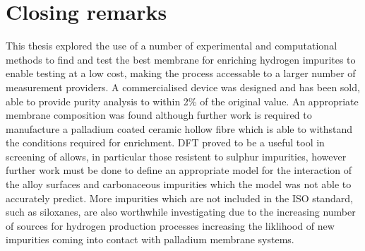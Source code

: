 \section{Closing remarks}
This thesis explored the use of a number of experimental and computational methods to find and test the best membrane for enriching hydrogen impurites to enable testing at a low cost, making the process accessable to a larger number of measurement providers. A commercialised device was designed and has been sold, able to provide purity analysis to within 2\% of the original value. An appropriate membrane composition was found although further work is required to manufacture a palladium coated ceramic hollow fibre which is able to withstand the conditions required for enrichment. DFT proved to be a useful tool in screening of allows, in particular those resistent to sulphur impurities, however further work must be done to define an appropriate model for the interaction of the alloy surfaces and carbonaceous impurities which the model was not able to accurately predict. More impurities which are not included in the ISO standard, such as siloxanes, are also worthwhile investigating due to the increasing number of sources for hydrogen production processes increasing the liklihood of new impurities coming into contact with palladium membrane systems.



